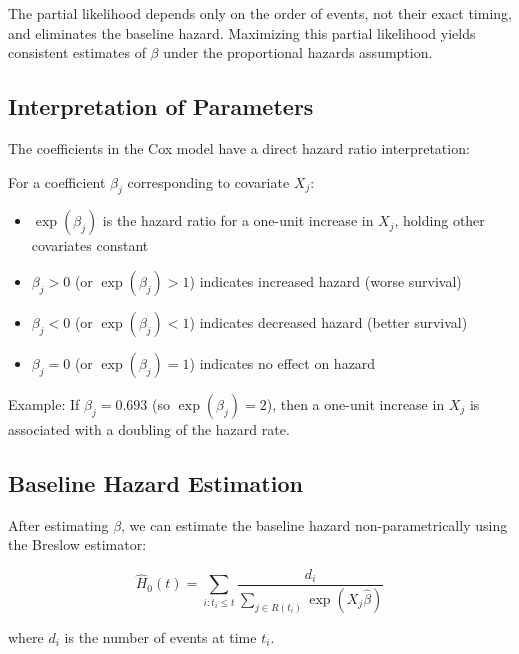 The partial likelihood depends only on the order of events, not their exact timing, and eliminates the baseline hazard. Maximizing this partial likelihood yields consistent estimates of $\beta$ under the proportional hazards assumption.

\subsection{Interpretation of Parameters}

The coefficients in the Cox model have a direct hazard ratio interpretation:

\begin{examplebox}[title=Interpreting Cox Model Coefficients]
For a coefficient $\beta_j$ corresponding to covariate $X_j$:
\begin{itemize}
    \item $\exp(\beta_j)$ is the hazard ratio for a one-unit increase in $X_j$, holding other covariates constant
    \item $\beta_j > 0$ (or $\exp(\beta_j) > 1$) indicates increased hazard (worse survival)
    \item $\beta_j < 0$ (or $\exp(\beta_j) < 1$) indicates decreased hazard (better survival)
    \item $\beta_j = 0$ (or $\exp(\beta_j) = 1$) indicates no effect on hazard
\end{itemize}

Example: If $\beta_j = 0.693$ (so $\exp(\beta_j) = 2$), then a one-unit increase in $X_j$ is associated with a doubling of the hazard rate.
\end{examplebox}

\subsection{Baseline Hazard Estimation}

After estimating $\beta$, we can estimate the baseline hazard non-parametrically using the Breslow estimator:

\begin{equationbox}[title=Breslow Estimator]
\begin{equation}
    \hat{H}_0(t) = \sum_{i: t_i \leq t} \frac{d_i}{\sum_{j \in R(t_i)} \exp(X_j\hat{\beta})}
\end{equation}

where $d_i$ is the number of events at time $t_i$.
\end{equationbox}

